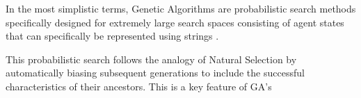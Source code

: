 
In the most simplistic terms, Genetic Algorithms are probabilistic search methods specifically designed for extremely large search spaces consisting of agent states that can specifically be represented using strings \cite{goldberg1988genetic}.



This probabilistic search follows the analogy of Natural Selection by automatically biasing subsequent generations to include the successful characteristics of their ancestors. This is a key feature of GA's 


